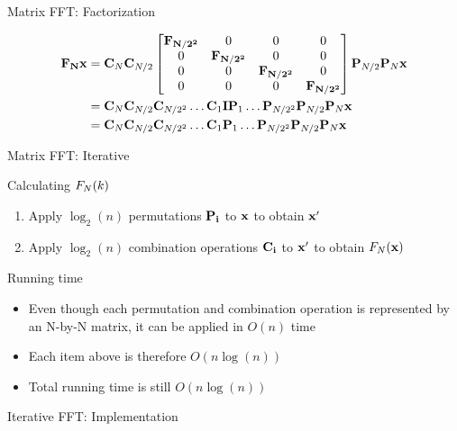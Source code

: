 \begin{myframe}{Matrix FFT: Factorization}
\centering

\begin{align*}
\mathbf{F_N} \mathbf{x} &=  
\mathbf{C}_N
\mathbf{C}_{N/2}
\begin{bmatrix}
\mathbf{F_{N/2^2}} & 0 & 0 & 0\\
0 & \mathbf{F_{N/2^2}} & 0 & 0 \\
0 & 0 & \mathbf{F_{N/2^2}} & 0  \\
0 & 0 & 0 & \mathbf{F_{N/2^2}}\\
\end{bmatrix}  
\mathbf{P}_{N/2}
\mathbf{P}_N \mathbf{x}\\
&=
\mathbf{C}_N
\mathbf{C}_{N/2}
\mathbf{C}_{N/2^2}
\dots
\mathbf{C}_{1}
\mathbf{I}
\mathbf{P}_{1}
\dots
\mathbf{P}_{N/2^2}
\mathbf{P}_{N/2}
\mathbf{P}_N \mathbf{x}\\
&= 
\mathbf{C}_N
\mathbf{C}_{N/2}
\mathbf{C}_{N/2^2}
\dots
\mathbf{C}_{1}
\mathbf{P}_{1}
\dots
\mathbf{P}_{N/2^2}
\mathbf{P}_{N/2}
\mathbf{P}_N \mathbf{x}\\
\end{align*}

\end{myframe}
\begin{myframe}{Matrix FFT: Iterative}
\centering

\begin{block}{Calculating $F_N(k)$}
\begin{enumerate}
\item Apply $\log_2(n)$ permutations $\mathbf{P_i}$ to $\mathbf{x}$ to obtain $\mathbf{x}'$
\item Apply $\log_2(n)$ combination operations $\mathbf{C_i}$ to $\mathbf{x}'$ to obtain $F_N(\mathbf{x})$
\end{enumerate}
\end{block}


\begin{block}{Running time}
\begin{itemize}
\item Even though each permutation and combination operation is represented by an N-by-N matrix, it can be applied in $O(n)$ time
\item Each item above is therefore $O(n \log(n))$
\item Total running time is still $O(n \log(n))$
\end{itemize}
\end{block}

\end{myframe}

\begin{myframe}{Iterative FFT: Implementation}
\centering

\end{myframe}

